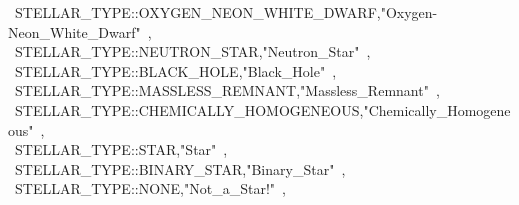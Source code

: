 \tabto{1.0em}\lcb\ STELLAR\_TYPE::OXYGEN\_NEON\_WHITE\_DWARF,\tabto{35.5em}"Oxygen-Neon\_White\_Dwarf"\ \rcb, \\
\tabto{1.0em}\lcb\ STELLAR\_TYPE::NEUTRON\_STAR,\tabto{35.5em}"Neutron\_Star"\ \rcb, \\
\tabto{1.0em}\lcb\ STELLAR\_TYPE::BLACK\_HOLE,\tabto{35.5em}"Black\_Hole"\ \rcb, \\
\tabto{1.0em}\lcb\ STELLAR\_TYPE::MASSLESS\_REMNANT,\tabto{35.5em}"Massless\_Remnant"\ \rcb, \\
\tabto{1.0em}\lcb\ STELLAR\_TYPE::CHEMICALLY\_HOMOGENEOUS,\tabto{35.5em}"Chemically\_Homogeneous"\ \rcb, \\
\tabto{1.0em}\lcb\ STELLAR\_TYPE::STAR,\tabto{35.5em}"Star"\ \rcb, \\
\tabto{1.0em}\lcb\ STELLAR\_TYPE::BINARY\_STAR,\tabto{35.5em}"Binary\_Star"\ \rcb, \\
\tabto{1.0em}\lcb\ STELLAR\_TYPE::NONE,\tabto{35.5em}"Not\_a\_Star!"\ \rcb, \\
\rcb{;}
\normalsize
